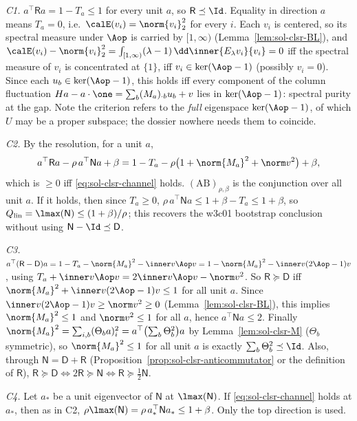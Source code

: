 \documentclass[../main.tex]{subfiles}
\begin{document}
\emph{C1.}  $a^\top\mathsf Ra=1-T_a\le1$ for every unit $a$, so $\mathsf R\preceq\Id$.
Equality in direction $a$ means $T_a=0$, i.e.\ $\calE(v_i)=\norm{v_i}_2^2$ for every $i$.
Each $v_i$ is centered, so its spectral measure under $\Aop$ is carried by $[1,\infty)$
(Lemma~\ref{lem:sol-clsr-BL}), and
$\calE(v_i)-\norm{v_i}_2^2=\int_{[1,\infty)}(\lambda-1)\,\dd\inner{E_\lambda v_i}{v_i}=0$ iff
the spectral measure of $v_i$ is concentrated at $\{1\}$, iff $v_i\in\ker(\Aop-1)$ (possibly
$v_i=0$).  Since each $u_b\in\ker(\Aop-1)$, this holds iff every component of the column
fluctuation $Ha-a\cdot\one=\sum_b(M_a)_{\cdot b}u_b+v$ lies in $\ker(\Aop-1)$: spectral purity
at the gap.  Note the criterion refers to the \emph{full} eigenspace $\ker(\Aop-1)$, of which
$U$ may be a proper subspace; the dossier nowhere needs them to coincide.

\emph{C2.}  By the resolution, for a unit $a$,
\[
  a^\top\mathsf Ra-\rho\,a^\top\mathsf Na+\beta
  =1-T_a-\rho\bigl(1+\norm{M_a}^2+\norm v^2\bigr)+\beta,
\]
which is $\ge0$ iff \eqref{eq:sol-clsr-channel} holds.  $(\mathrm{AB})_{\rho,\beta}$ is the
conjunction over all unit $a$.  If it holds, then since $T_a\ge0$,
$\rho\,a^\top\mathsf Na\le1+\beta-T_a\le1+\beta$, so
$Q_{\mathrm{lin}}=\lmax(\mathsf N)\le(1+\beta)/\rho$; this recovers the w3c01 bootstrap
conclusion without using $\mathsf N-\Id\preceq\mathsf D$.

\emph{C3.}  $a^\top(\mathsf R-\mathsf D)a
=1-T_a-\norm{M_a}^2-\inner v{\Aop v}
=1-\norm{M_a}^2-\inner v{(2\Aop-1)v}$, using
$T_a+\inner v{\Aop v}=2\inner v{\Aop v}-\norm v^2$.  So $\mathsf R\succeq\mathsf D$ iff
$\norm{M_a}^2+\inner v{(2\Aop-1)v}\le1$ for all unit $a$.  Since
$\inner v{(2\Aop-1)v}\ge\norm v^2\ge0$ (Lemma~\ref{lem:sol-clsr-BL}), this implies
$\norm{M_a}^2\le1$ and $\norm v^2\le1$ for all $a$, hence $a^\top\mathsf Na\le2$.  Finally
$\norm{M_a}^2=\sum_{i,b}(\Theta_ba)_i^2=a^\top\bigl(\sum_b\Theta_b^2\bigr)a$ by
Lemma~\ref{lem:sol-clsr-M} ($\Theta_b$ symmetric), so $\norm{M_a}^2\le1$ for all unit $a$ is
exactly $\sum_b\Theta_b^2\preceq\Id$.  Also, through $\mathsf N=\mathsf D+\mathsf R$
(Proposition~\ref{prop:sol-clsr-anticommutator} or the definition of $\mathsf R$),
$\mathsf R\succeq\mathsf D\iff2\mathsf R\succeq\mathsf N\iff
\mathsf R\succeq\tfrac12\mathsf N$.

\emph{C4.}  Let $a_*$ be a unit eigenvector of $\mathsf N$ at $\lmax(\mathsf N)$.  If
\eqref{eq:sol-clsr-channel} holds at $a_*$, then as in C2,
$\rho\lmax(\mathsf N)=\rho\,a_*^\top\mathsf Na_*\le1+\beta$.  Only the top direction is used.
\end{document}
